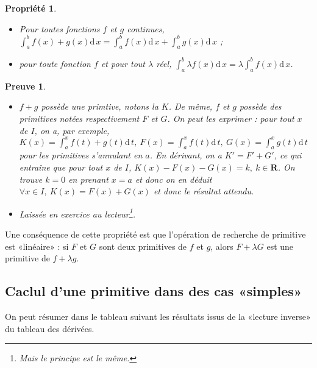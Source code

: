 \documentclass[11pt,a4paper,french]{article}
\newcommand{\R}{\mathbf{R}}
\newcommand{\diff}[1]{\mathrm{d}\,#1}
\theoremstyle{break}
\newtheorem{propriete}{Propriété}
\theoremstyle{plain}
\theoremstyle{nonumberplain}
\newtheorem{preuve}{Preuve}
\theoremstyle{nonumberbreak}
\begin{document}
\begin{propriete}
  \begin{itemize}
    \item Pour toutes fonctions $f$ et $g$ continues, $\int_a^bf(x) +
      g(x)\diff{x} = \int_a^bf(x) \diff{x} + \int_a^bg(x)\diff{x}$ ;
    \item pour toute fonction $f$ et pour tout $\lambda$ réel, $\int_a^b
      \lambda f(x) \diff{x} = \lambda \int_a^b f(x) \diff{x}$.
  \end{itemize}
\end{propriete}
\begin{preuve}
  \begin{itemize}
    \item $f+g$ possède une primtive, notons la $K$. De même, $f$ et $g$
      possède des primitives notées respectivement $F$ et $G$. On peut
      les exprimer : pour tout $x$ de $I$, on a, par exemple, $K(x) =
      \int_a^xf(t) + g(t)\diff{t},\ F(x) = \int_a^xf(t) \diff{t},
      \ G(x) = \int_a^xg(t)\diff{t}$ pour les primitives s'annulant en
      $a$. En dérivant, on a $K' = F' + G'$, ce qui entraîne que pour
      tout $x$ de $I$, $K(x) - F(x) - G(x) = k,\ k\in\R$. On trouve $k =
      0$ en prenant $x = a$ et donc on en déduit $\forall x\in I,\ K(x)
      = F(x) + G(x)$ et donc le résultat attendu.
    \item Laissée en exercice au lecteur\footnote{Mais le principe est
      le même.}.
  \end{itemize}
\end{preuve}

Une conséquence de cette propriété est que l'opération de recherche de
primitive est «linéaire» : si $F$ et $G$ sont deux primitives de $f$ et
$g$, alors $F+\lambda G$ est une primitive de $f+\lambda g$.

\subsection{Caclul d'une primitive dans des cas «simples»}

On peut résumer dans le tableau suivant les résultats issus de la
«lecture inverse» du tableau des dérivées.

\renewcommand{\arraystretch}{2.1}
\end{document}
